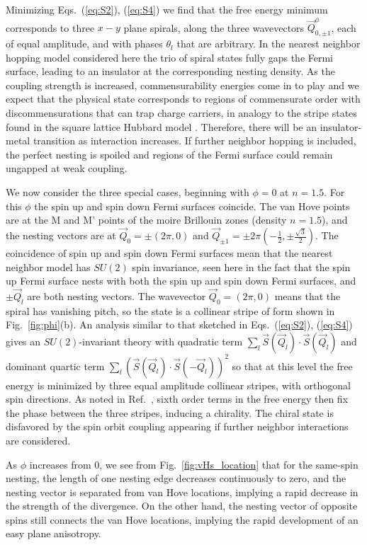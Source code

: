 \documentclass[%
reprint,
superscriptaddress,
twocolumn,
 amsmath,amssymb,
 aps,
 prb,
]{revtex4-2}
\begin{document}
Minimizing Eqs.~(\ref{eq:S2}), (\ref{eq:S4}) we find that the free energy minimum corresponds to three $x-y$ plane spirals, along the three wavevectors $\vec{Q}_{0,\pm1}^\phi$, each of equal amplitude, and with phases $\theta_l$ that are arbitrary. In the nearest neighbor hopping model considered here the trio of spiral states fully gaps the Fermi surface, leading to an insulator at the corresponding nesting density. As the coupling strength is increased, commensurability energies come in to play and we expect that the physical state corresponds to regions of commensurate order with discommensurations that can trap charge carriers, in analogy to the stripe states found in the square lattice Hubbard model \cite{PhysRevB.40.7391,PhysRevB.44.943,machida1989magnetism,kato1990soliton}. Therefore, there will be an insulator-metal transition as interaction increases. If further neighbor hopping is included, the perfect nesting is spoiled and regions of the Fermi surface could remain ungapped at weak coupling. 

We now consider the three special cases, beginning with $\phi=0$ at $n=1.5$. For this $\phi$ the spin up and spin down Fermi surfaces coincide.  The van Hove points are at the M and M' points of the moire Brillouin zones (density $n=1.5$), and the nesting vectors are at $\vec{Q}_0=\pm(2\pi,0)$ and $\vec{Q}_{\pm1}=\pm2\pi(-\frac{1}{2},\pm\frac{\sqrt{3}}{2})$. The coincidence of spin up and spin down Fermi surfaces mean that the nearest neighbor model has $SU(2)$ spin invariance, seen here in the fact that the spin up Fermi surface nests with both the spin up and spin down Fermi surfaces, and $\pm \vec{Q}_{l}$ are both nesting vectors. The wavevector $\vec{Q}_0=(2\pi,0)$ means that the spiral has vanishing pitch, so the state is a collinear stripe of form shown in Fig.~\ref{fig:phi}(b). An analysis similar to that sketched in Eqs.~(\ref{eq:S2}), (\ref{eq:S4}) gives an $SU(2)$-invariant theory with quadratic term $\sum_l\vec{S}(\vec{Q}_l)\cdot\vec{S}(\vec{Q}_l)$ and dominant quartic term $\sum_l \left(\vec{S}(\vec{Q}_l)\cdot\vec{S}(-\vec{Q}_l)\right)^2$ so that at this level  the free energy is minimized by three equal amplitude collinear stripes, with  orthogonal spin directions. As noted in Ref.~\cite{martin2008itinerant}, sixth order terms in the free energy then fix the phase between the three stripes, inducing  a chirality. The chiral state is disfavored by the spin orbit coupling appearing if further neighbor interactions are considered. 

As $\phi$ increases from 0, we see from Fig.~\ref{fig:vHs_location} that for the same-spin nesting, the length of one nesting edge decreases continuously to zero, and the nesting vector is separated from van Hove locations, implying a rapid decrease in the strength of the divergence. On the other hand, the nesting vector of opposite spins still connects the van Hove locations, implying the rapid development of an easy plane anisotropy.  
\end{document}

